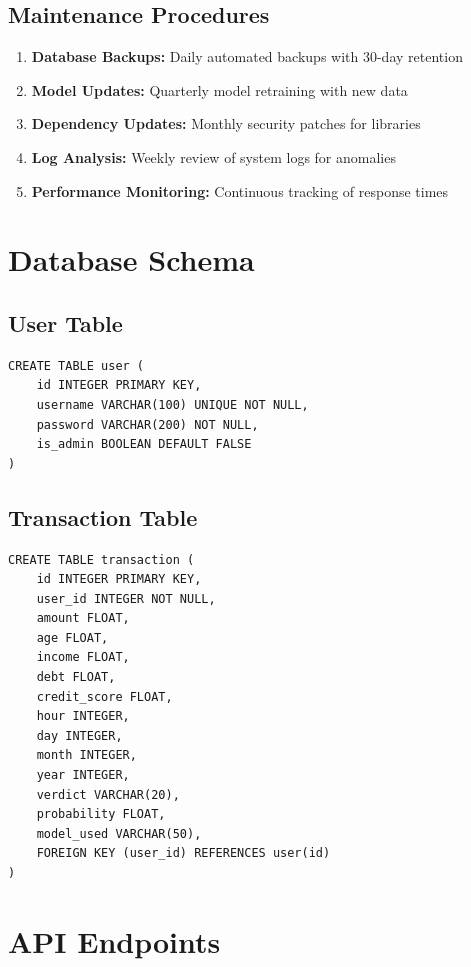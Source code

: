 \documentclass[12pt,a4paper,twoside]{report}
\begin{document}
\subsection{Maintenance Procedures}

\begin{enumerate}
    \item \textbf{Database Backups:} Daily automated backups with 30-day retention
    \item \textbf{Model Updates:} Quarterly model retraining with new data
    \item \textbf{Dependency Updates:} Monthly security patches for libraries
    \item \textbf{Log Analysis:} Weekly review of system logs for anomalies
    \item \textbf{Performance Monitoring:} Continuous tracking of response times
\end{enumerate}

\section{Database Schema}

\subsection{User Table}

\begin{verbatim}
CREATE TABLE user (
    id INTEGER PRIMARY KEY,
    username VARCHAR(100) UNIQUE NOT NULL,
    password VARCHAR(200) NOT NULL,
    is_admin BOOLEAN DEFAULT FALSE
)
\end{verbatim}

\subsection{Transaction Table}

\begin{verbatim}
CREATE TABLE transaction (
    id INTEGER PRIMARY KEY,
    user_id INTEGER NOT NULL,
    amount FLOAT,
    age FLOAT,
    income FLOAT,
    debt FLOAT,
    credit_score FLOAT,
    hour INTEGER,
    day INTEGER,
    month INTEGER,
    year INTEGER,
    verdict VARCHAR(20),
    probability FLOAT,
    model_used VARCHAR(50),
    FOREIGN KEY (user_id) REFERENCES user(id)
)
\end{verbatim}

\section{API Endpoints}
\end{document}
